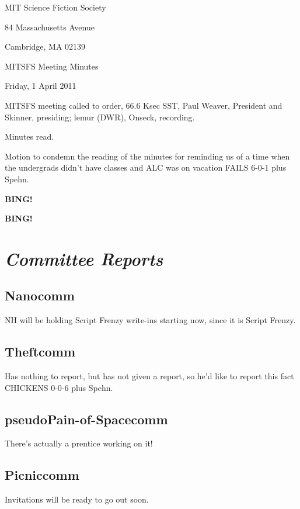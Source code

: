 \documentclass[10pt]{article}
\newcommand{\bing}{{\bf BING!} }
\newcommand{\goto}[1]{\bing \vskip 12pt \section*{{\em{#1}}}}
\newcommand{\ps}{ plus Spehn\xspace}
\newcommand{\skinner}{Paul Weaver, President and Skinner}
\newcommand{\onseck}{lemur (DWR), Onseck}
\newcommand{\meetingdate}{Friday, 1 April 2011}
\begin{document}
\begin{center}

MIT Science Fiction Society

84 Massachusetts Avenue

Cambridge, MA 02139

\vspace{12pt}

MITSFS Meeting Minutes

\meetingdate

\end{center}

\vspace{18pt}

\setlength{\parskip}{6pt}

\noindent
MITSFS meeting called to order, 66.6 Ksec SST,
\skinner, presiding; \onseck, recording.

Minutes read.

Motion to condemn the reading of the minutes for reminding
us of a time when the undergrads didn't have classes and 
ALC was on vacation FAILS 6-0-1\ps.

\bing

\goto{Committee Reports}

\subsection*{Nanocomm}

NH will be holding Script Frenzy write-ins starting now, since
it is Script Frenzy.


\subsection*{Theftcomm}

Has nothing to report, but has not given a report, so he'd
like to report this fact CHICKENS 0-0-6\ps.


\subsection*{pseudoPain-of-Spacecomm}

There's actually a prentice working on it!


\subsection*{Picniccomm}

Invitations will be ready to go out soon.
\end{document}
